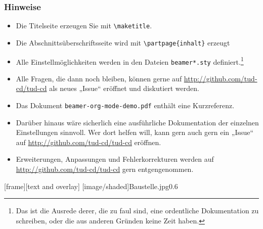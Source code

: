 \begin{frame}[allowframebreaks]\frametitle{Hinweise}
  \begin{itemize}
  \item Die Titelseite erzeugen Sie mit \texttt{\textbackslash maketitle}.
  \item Die Abschnittsüberschriftsseite wird mit \texttt{\textbackslash partpage\{inhalt\}} erzeugt
  \item Alle Einstellmöglichkeiten werden in den Dateien \texttt{beamer*.sty}
    definiert.\footnote{Das ist die Ausrede derer, die zu faul sind,
      eine ordentliche Dokumentation zu schreiben, oder die aus anderen Gründen keine Zeit haben.}
  \item Alle Fragen, die dann noch bleiben, können gerne auf \url{http://github.com/tud-cd/tud-cd} als neues „Issue“ eröffnet und diskutiert werden.
  \item Das Dokument \texttt{beamer-org-mode-demo.pdf} enthält eine Kurzreferenz.
  \item Darüber hinaus wäre sicherlich eine ausführliche Dokumentation der einzelnen Einstellungen sinnvoll. Wer dort helfen will, kann gern auch gern ein „Issue“ auf \url{http://github.com/tud-cd/tud-cd} eröffnen.
  \item Erweiterungen, Anpassungen und Fehlerkorrekturen werden auf
    \url{http://github.com/tud-cd/tud-cd} gern entgengenommen.
  \end{itemize}
\end{frame}

[frame][text and overlay]
[image/shaded]{Baustelle.jpg}{0.6}
